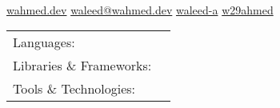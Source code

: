 \documentclass[]{awesome-cv}
\begin{document}
    
\begin{center}
	  \\
	\vspace{2mm}
	\href{https://wahmed.dev}{{\textcolor{darkblue}{\faGlobe} wahmed.dev}}
	\hspace{2mm}
	\href{mailto:waleed@wahmed.dev}{{\textcolor{darkblue}{\faEnvelope} waleed@wahmed.dev}}
	\hspace{2mm}
	\href{https://www.linkedin.com/in/waleed-a}{{\textcolor{darkblue}{\faLinkedin} waleed-a}}
	\hspace{2mm} 
	\href{https://github.com/w29ahmed}{{\textcolor{darkblue}{\faGithub} w29ahmed}}
\end{center}
\vspace{-4mm}
\begin{cventries}
	\cventry
	{}
	{\def\arraystretch{1.15}{\begin{tabular}{ l l }
		Languages:  & \hspace{1mm} {\skill{ C++, C, Python, JavaScript, Java, Rust, C\#, HTML, CSS, SQL, QML, Assembly}} \\
		Libraries \& Frameworks:  & \hspace{1mm} {\skill{ ROS, OpenCV, Qt, Node, React, Express, Flask, Google Test, Thrift, Hadoop, Kafka}} \\
		Tools \& Technologies:  & \hspace{1mm} {\skill{ Git, Linux, QNX, Perforce, SVN, MongoDB, Jenkins, Docker, LaTeX, Jira}} \\
		\end{tabular}}}
	{}
	{}
	{}
\end{cventries}

\vspace{-7mm}
\end{document}
